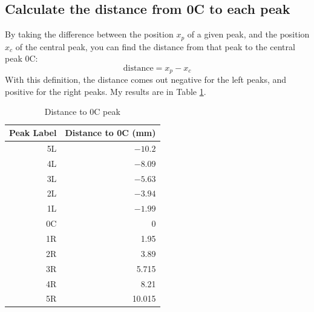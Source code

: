 \subsection{Calculate the distance from 0C to each peak}
By taking the difference between the position $x_{p}$ of a given peak, and the position $x_{c}$ of the central peak, you can find the distance from that peak to the central peak 0C:
\begin{equation}
	\text{distance} = x_{p} - x_{c}
\end{equation}
With this definition, the distance comes out negative for the left peaks, and positive for the right peaks. My results are in Table \ref{table.disC}.
\begin{table}[ht!]
	\centering
	\begin{tabular}{|r|r|} \hline
		Peak Label & Distance to 0C (mm) \\
		\hline
		5L & $-10.2$ \\
		4L & $-8.09$ \\
		3L & $-5.63$ \\
		2L & $-3.94$ \\
		1L & $-1.99$ \\
		0C & 0 \\
		1R & 1.95 \\
		2R & 3.89 \\
		3R & 5.715 \\
		4R & 8.21 \\
		5R & 10.015 \\
		\hline
	\end{tabular}
	\caption{Distance to 0C peak}
	\label{table.disC}
\end{table}
